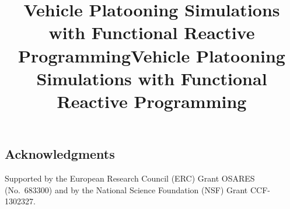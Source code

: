 \documentclass[sigconf]{acmart}
\begin{document}

\setcounter{footnote}{1}
\def\mynewline{\ifnum\value{footnote} > \value{x} \\ \fi}
\title{Vehicle Platooning Simulations with Functional Reactive Programming}
\maketitle

\title{Vehicle Platooning Simulations with Functional Reactive Programming}







\subsection*{Acknowledgments} 
Supported by the European Research Council (ERC) Grant OSARES (No.\ 683300) and 
 by the National Science Foundation (NSF) Grant CCF-1302327.


 
\end{document}
